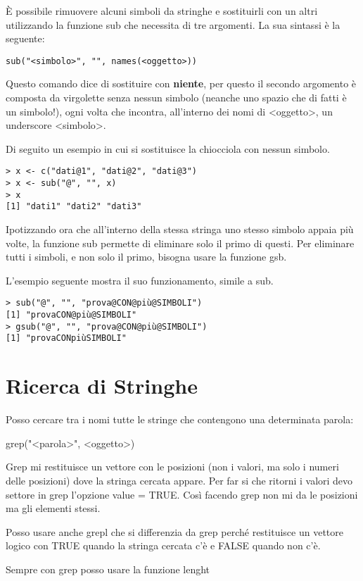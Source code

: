 È possibile rimuovere alcuni simboli da stringhe e sostituirli con un altri utilizzando la funzione \textsf{sub} che necessita di tre argomenti. La sua sintassi è la seguente:
\begin{lstlisting}
sub("<simbolo>", "", names(<oggetto>))
\end{lstlisting}
Questo comando dice di sostituire con \textbf{niente}, per questo il secondo argomento è composta da virgolette senza nessun simbolo (neanche uno spazio che di fatti è un simbolo!), ogni volta che incontra, all'interno dei nomi di <oggetto>, un underscore <simbolo>.

Di seguito un esempio in cui si sostituisce la chiocciola con nessun simbolo.
\begin{lstlisting}
> x <- c("dati@1", "dati@2", "dati@3")
> x <- sub("@", "", x)
> x
[1] "dati1" "dati2" "dati3"
\end{lstlisting}

Ipotizzando ora che all'interno della stessa stringa uno stesso simbolo appaia più volte, la funzione \textsf{sub} permette di eliminare solo il primo di questi. Per eliminare tutti i simboli, e non solo il primo, bisogna usare la funzione \textsf{gsb}.

L'esempio seguente mostra il suo funzionamento, simile a \textsf{sub}.

\begin{lstlisting}
> sub("@", "", "prova@CON@più@SIMBOLI")
[1] "provaCON@più@SIMBOLI"
> gsub("@", "", "prova@CON@più@SIMBOLI")
[1] "provaCONpiùSIMBOLI"
\end{lstlisting}


\section{Ricerca di Stringhe}
Posso cercare tra i nomi tutte le stringe che contengono una determinata parola:

	grep("<parola>", <oggetto>)

Grep mi restituisce un vettore con le posizioni (non i valori, ma solo i numeri delle posizioni) dove la stringa cercata appare. Per far si che ritorni i valori devo settore in grep l'opzione value = TRUE. Così facendo grep non mi da le posizioni ma gli elementi stessi.

Posso usare anche grepl che si differenzia da grep perché restituisce un vettore logico con TRUE quando la stringa cercata c'è e FALSE quando non c'è.

Sempre con grep posso usare la funzione lenght

